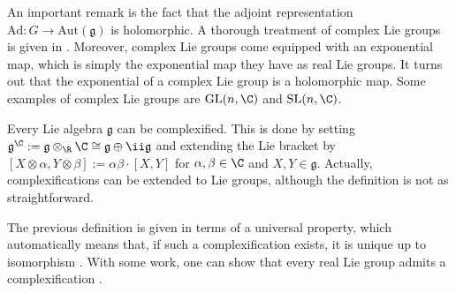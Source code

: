 An important remark is the fact that the adjoint representation \(\mathrm{Ad}\colon G \to \mathrm{Aut}(\mathfrak{g})\) is holomorphic. A thorough treatment of complex Lie groups is given in \parencite{Lee_2002_complex_Lie}. Moreover, complex Lie groups come equipped with an exponential map, which is simply the exponential map they have as real Lie groups. It turns out that the exponential of a complex Lie group is a holomorphic map. Some examples of complex Lie groups are \(\mathrm{GL}(n, \C)\) and \(\mathrm{SL}(n, \C)\).

Every Lie algebra \(\mathfrak{g}\) can be complexified. This is done by setting \(\mathfrak{g}^\C:=\mathfrak{g} \otimes_\R \C\cong \mathfrak{g} \oplus \ii \mathfrak{g}\) and extending the Lie bracket by \([X \otimes \alpha, Y \otimes \beta]:=\alpha \beta \cdot [X,Y]\) for \(\alpha, \beta \in \C\) and \(X,Y \in \mathfrak{g}\). Actually, complexifications can be extended to Lie groups, although the definition is not as straightforward.

The previous definition is given in terms of a universal property, which automatically means that, if such a complexification exists, it is unique up to isomorphism \parencite[Remark 15.1.3]{hilgert2011structure}. With some work, one can show that every real Lie group admits a complexification \parencite[Th. 15.1.4]{hilgert2011structure}. 

